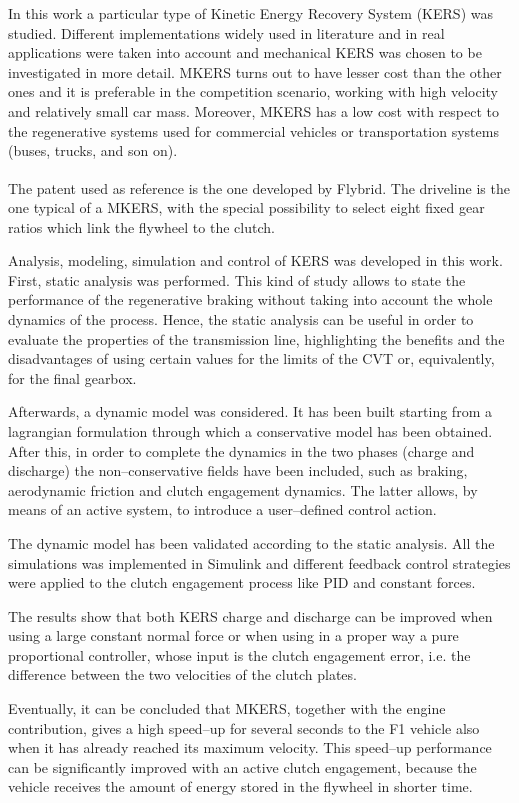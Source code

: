 \documentclass[11pt]{article}
\begin{document}
In this work a particular type of Kinetic Energy Recovery System (KERS) was studied. Different implementations widely used in literature and in real applications were taken into account and mechanical KERS was chosen to be investigated in more detail. MKERS turns out to have lesser cost than the other ones and it is preferable in the competition scenario, working with high velocity and relatively small car mass. Moreover, MKERS has a low cost with respect to the regenerative systems used for commercial vehicles or transportation systems (buses, trucks, and son on). 

The patent used as reference is the one developed by Flybrid\textsuperscript\textregistered. The driveline is the one typical of a MKERS, with the special possibility to select eight fixed gear ratios which link the flywheel to the clutch.

Analysis, modeling, simulation and control of KERS was developed in this work. First, static analysis was performed. This kind of study allows to state the performance of the regenerative braking without taking into account the whole dynamics of the process. Hence, the static analysis can be useful in order to evaluate the properties of the transmission line, highlighting the benefits and the disadvantages of using certain values for the limits of the CVT or, equivalently, for the final gearbox. 

Afterwards, a dynamic model was considered. It has been built starting from a lagrangian formulation through which a conservative model has been obtained. After this, in order to complete the dynamics in the two phases (charge and discharge) the non--conservative fields have been included, such as braking, aerodynamic friction and clutch engagement dynamics. The latter allows, by means of an active system, to introduce a user--defined control action.

The dynamic model has been validated according to the static analysis. All the simulations was implemented in Simulink and different feedback control strategies were applied to the clutch engagement process like PID and constant forces. 

The results show that both KERS charge and discharge can be improved when using a large constant normal force or when using in a proper way a pure proportional controller, whose input is the clutch engagement error, i.e. the difference between the two velocities of the clutch plates.

Eventually, it can be concluded that MKERS, together with the engine contribution, gives a high speed--up for several seconds to the F1 vehicle also when it has already reached its maximum velocity. This speed--up performance can be significantly improved with an active clutch engagement, because the vehicle receives the amount of energy stored in the flywheel in shorter time.  
\end{document}
